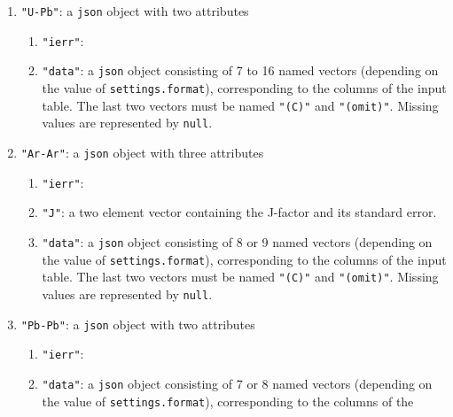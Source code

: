 \begin{refsection}
\begin{enumerate}[leftmargin=\parindent,align=left,
      labelwidth=\parindent,label*=3.\arabic*.]
\item{\tt "U-Pb"}: a \texttt{json} object with two attributes
  \begin{enumerate}[leftmargin=\parindent,align=left,
      labelwidth=\parindent,label*=\arabic*.]
    \item{\tt "ierr"}: 
    \item{\tt "data"}: a \texttt{json} object consisting of 7 to 16
      named vectors (depending on the value of
      \texttt{settings.format}), corresponding to the columns of the
      input table. The last two vectors must be named \texttt{"(C)"}
      and \texttt{"(omit)"}. Missing values are represented by
      \texttt{null}.
  \end{enumerate}  
\item{\tt "Ar-Ar"}: a \texttt{json} object with three attributes
  \begin{enumerate}[leftmargin=\parindent,align=left,
      labelwidth=\parindent,label*=\arabic*.]
    \item{\tt "ierr"}: 
    \item{\tt "J"}: a two element vector containing the J-factor and
      its standard error.
    \item{\tt "data"}: a \texttt{json} object consisting of 8 or 9
      named vectors (depending on the value of
      \texttt{settings.format}), corresponding to the columns of the
      input table. The last two vectors must be named \texttt{"(C)"}
      and \texttt{"(omit)"}. Missing values are represented by
      \texttt{null}.
  \end{enumerate} 
\item{\tt "Pb-Pb"}: a \texttt{json} object with two attributes
  \begin{enumerate}[leftmargin=\parindent,align=left,
      labelwidth=\parindent,label*=\arabic*.]
    \item{\tt "ierr"}: 
    \item{\tt "data"}: a \texttt{json} object consisting of 7 or 8
      named vectors (depending on the value of
      \texttt{settings.format}), corresponding to the columns of the

\end{enumerate}
\end{enumerate}
\end{refsection}

